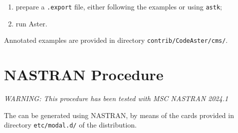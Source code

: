\begin{enumerate}
\item prepare a \texttt{.export} file, either following the examples
or using \texttt{astk};

\item run Aster.

\end{enumerate} %
Annotated examples are provided in directory \texttt{contrib/CodeAster/cms/}.



\section{NASTRAN Procedure}
\label{sec:APP:EL:STRUCT:JOINT:MODAL:NASTRAN}
\emph{WARNING: This procedure has been tested with MSC NASTRAN 2024.1}

The  can be generated using NASTRAN,
by means of the  cards provided in directory \texttt{etc/modal.d/}
of the distribution.


